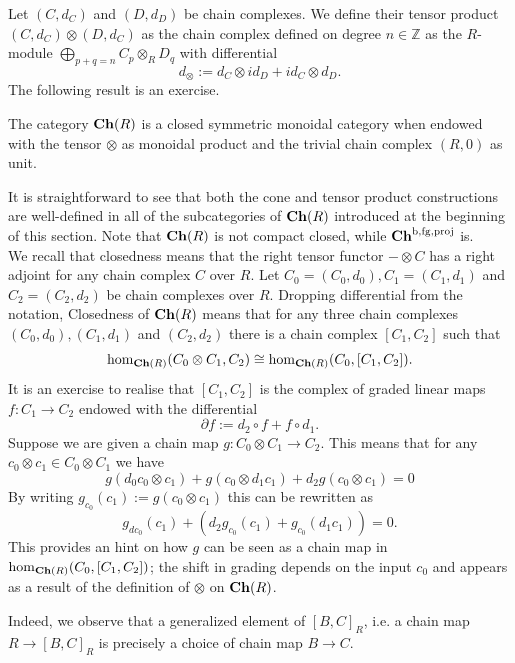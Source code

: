 Let $(C,d_C)$ and $(D,d_D)$ be chain complexes. We define their tensor product $(C,d_C)\otimes (D,d_C)$ as the chain complex defined on degree $n\in \mathbb{Z}$ as the $R$-module $\bigoplus_{p+q=n}C_p\otimes_R D_q$ with differential $$d_\otimes := d_C\otimes id_D+id_C\otimes d_D.$$
The following result is an exercise.
\begin{lem}\label{chisclosed}
   The category $\mathbf{Ch}(R)$ is a closed symmetric monoidal category when endowed with the tensor $\otimes$ as monoidal product and the trivial chain complex $(R,0)$ as unit. 
\end{lem}
It is straightforward to see that both the cone and tensor product constructions are well-defined in all of the subcategories of $\mathbf{Ch}(R)$ introduced at the beginning of this section. Note that $\mathbf{Ch}(R)$ is not compact closed, while $\mathbf{Ch}^{\text{b},\text{fg},\text{proj}}$ is.\\

We recall that closedness means that the right tensor functor $-\otimes C$ has a right adjoint for any chain complex $C$ over $R$. Let $C_0=(C_0,d_0), C_1=(C_1,d_1)$ and $C_2=(C_2,d_2)$ be chain complexes over $R$. Dropping differential from the notation, Closedness of $\mathbf{Ch}(R)$ means that for any three chain complexes $(C_0,d_0), (C_1,d_1)$ and $(C_2,d_2)$ there is a chain complex $[C_1,C_2]$ such that $$\hom_{\mathbf{Ch}(R)}(C_0\otimes C_1,C_2)\cong \hom_{\mathbf{Ch}(R)}(C_0,[C_1,C_2]).$$
It is an exercise to realise that $[C_1,C_2]$ is the complex of graded linear maps $f\colon C_1\to C_2$ endowed with the differential \begin{equation}\label{partf}
\partial f := d_2\circ f+ f\circ d_1.
\end{equation} Suppose we are given a chain map $g\colon C_0\otimes C_1\to C_2$. This means that for any $c_0\otimes c_1\in C_0\otimes C_1$ we have $$g(d_0c_0\otimes c_1)+ g(c_0\otimes d_1c_1)+d_2g(c_0\otimes c_1)=0$$ By writing $g_{c_0}(c_1):=g(c_0\otimes c_1)$ this can be rewritten as $$g_{dc_0}(c_1)+(d_2g_{c_0}(c_1)+g_{c_0}(d_1c_1))=0.$$ This provides an hint on how $g$ can be seen as a chain map in $\hom_{\mathbf{Ch}(R)}(C_0,[C_1,C_2])$; the shift in grading depends on the input $c_0$ and appears as a result of the definition of $\otimes$ on $\mathbf{Ch}(R)$.

\begin{remark}
    Indeed, we observe that a generalized element of $[B,C]_R$, i.e. a chain map $R\to [B,C]_R$ is precisely a choice of chain map $B\to C$.
\end{remark}

